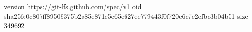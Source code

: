 version https://git-lfs.github.com/spec/v1
oid sha256:0c807ff89509375b2a85e871c5e65e627ee779443f0f720c6c7e2efbc3b04b51
size 349692
